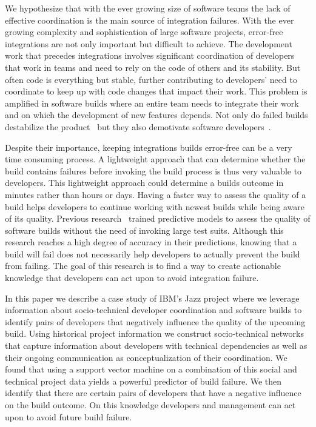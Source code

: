 \documentclass[12pt,oneside]{book}
\begin{document}
\label{chap:stc-net}
We hypothesize that with the ever growing size of software teams the lack of
effective coordination is the main source of integration failures.  With the
ever growing complexity and sophistication of large software projects,
error-free integrations are not only important but difficult to achieve. The
development work that precedes integrations involves significant coordination of
developers that work in teams and need to rely on the code of others and its
stability. But often code is everything but stable, further contributing to
developers' need to coordinate to keep up with code changes that impact their work. This problem is
amplified in software builds where an entire team needs to integrate their work
and on which the development of new features depends. Not only do
failed builds destabilize the product~\cite{cusumano1997} but they also demotivate
software developers~\cite{holck2004}.

Despite their importance, keeping integrations builds error-free can be a very time consuming
process. A lightweight approach that can determine whether the build contains
failures before invoking the build process is thus very valuable to developers.
This lightweight approach could determine a builds outcome in minutes rather than hours or days. Having a faster way to
assess the quality of a build helps developers to continue working with newest
builds while being aware of its quality. Previous
research~\cite{wolf:icse:2009,hassan:ase:2006} trained predictive models to assess the quality of software builds without the need of invoking large test
suits. Although this research
reaches a high degree of accuracy in their predictions, knowing that a
build will fail does not necessarily help developers to actually prevent
the build from failing.
The goal of this research is to find a way to create actionable knowledge that
developers can act upon to avoid
integration failure.

In this paper we describe a case study of IBM's Jazz project where we leverage
information about socio-technical developer coordination and software builds to
identify pairs of developers that negatively influence the quality of the
upcoming build. Using historical project information we construct socio-technical
networks that capture information about developers with technical dependencies
as well as their ongoing communication as conceptualization of their coordination.
We found that using a support vector machine on a combination of this social
and technical project data yields a powerful predictor of build failure. We
then identify that there are certain pairs of developers that have a
negative influence on the build outcome. On this knowledge developers and management can
act upon to avoid future build failure.
\end{document}
